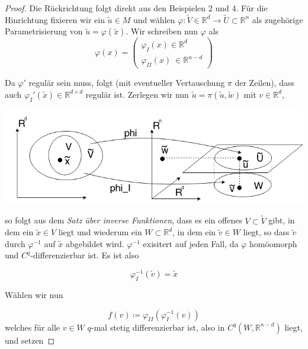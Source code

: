 \begin{proof}

Die Rückrichtung folgt direkt aus den Beispielen 2 und 4. Für die Hinrichtung fixieren wir ein $\tilde{u} \in M $ und wählen $\varphi : \tilde{V} \in \mathbb{R}^d
\rightarrow \tilde{U} \subset \mathbb{R}^n $ als zugehörige Parametrisierung von $\tilde{u} = \varphi (\tilde{x})$. Wir schreiben nun $\varphi$ als 
\begin{equation*}
\varphi(x)=\begin{pmatrix}\varphi_I(x) \in\mathbb{R}^d \\ \varphi_{II}(x) \ \in\mathbb{R}^{n-d} \end{pmatrix}
\end{equation*}

Da $\varphi'$ regulär sein muss, folgt (mit eventueller Vertauschung $\pi$ der Zeilen), dass auch $\varphi_I'(\tilde{x})\in\mathbb{R}^{d\times d}$ regulär ist. Zerlegen wir nun $\tilde{u}=\pi(\tilde{u},\tilde{w})$ mit $v\in\mathbb{R}^d$,

\begin{center}
\includegraphics[scale=0.5]{pictures/002-01}\\
\end{center}

so folgt aus dem \emph{Satz über inverse Funktionen}, dass es ein offenes $V\subset\tilde{V}$ gibt, in dem ein $\tilde{x}\in V$ liegt und wiederum ein $W\subset\mathbb{R}^d$, in dem ein $\tilde{v}\in W$ liegt, so dass $\tilde{v}$ durch $\varphi^{-1}$ auf $\tilde{x}$ abgebildet wird. $\varphi^{-1}$ exisitert auf jeden Fall, da $\varphi$ homöomorph und $C^q$-differenzierbar ist. Es ist also

\begin{equation*}
\varphi_I^{-1}(\tilde{v})=\tilde{x}
\end{equation*}

Wählen wir nun 

\begin{equation*}
f(v) \coloneqq \varphi_{II} \left(\varphi_I ^{-1} (v)\right)
\end{equation*}
\linebreak
welches für alle $v \in W $ $q$-mal stetig differenzierbar ist, also in $C^q \left(W, \mathbb{R}^{n-d}\right) $ liegt, und setzen 


\end{proof}
